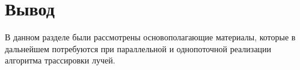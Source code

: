\begin{figure}[ht!]
\end{figure}

\section{Вывод}

В данном разделе были рассмотрены
основополагающие материалы, которые в дальнейшем потребуются
при параллельной и однопоточной реализации алгоритма трассировки лучей.  
